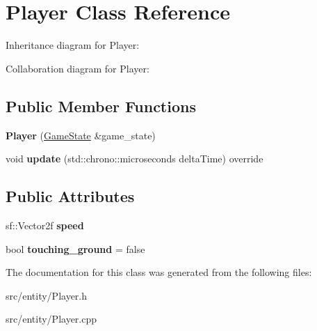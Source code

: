 \hypertarget{classPlayer}{\section{Player Class Reference}
\label{classPlayer}
}


Inheritance diagram for Player\-:


Collaboration diagram for Player\-:
\subsection*{Public Member Functions}
\begin{DoxyCompactItemize}
\item 
\hypertarget{classPlayer_a5998ebfddb5e333bd10fd1fc18e93f6a}{{\bfseries Player} (\hyperlink{classGameState}{Game\-State} \&game\-\_\-state)}\label{classPlayer_a5998ebfddb5e333bd10fd1fc18e93f6a}

\item 
\hypertarget{classPlayer_ae3153f2d8d00bcb2ea1025f394d29041}{void {\bfseries update} (std\-::chrono\-::microseconds delta\-Time) override}\label{classPlayer_ae3153f2d8d00bcb2ea1025f394d29041}

\end{DoxyCompactItemize}
\subsection*{Public Attributes}
\begin{DoxyCompactItemize}
\item 
\hypertarget{classPlayer_aac86a0c16c74e68268e6f37f1b21659f}{sf\-::\-Vector2f {\bfseries speed}}\label{classPlayer_aac86a0c16c74e68268e6f37f1b21659f}

\item 
\hypertarget{classPlayer_a61a49594880340b6187d99016e831f20}{bool {\bfseries touching\-\_\-ground} = false}\label{classPlayer_a61a49594880340b6187d99016e831f20}

\end{DoxyCompactItemize}


The documentation for this class was generated from the following files\-:\begin{DoxyCompactItemize}
\item 
src/entity/Player.\-h\item 
src/entity/Player.\-cpp\end{DoxyCompactItemize}
